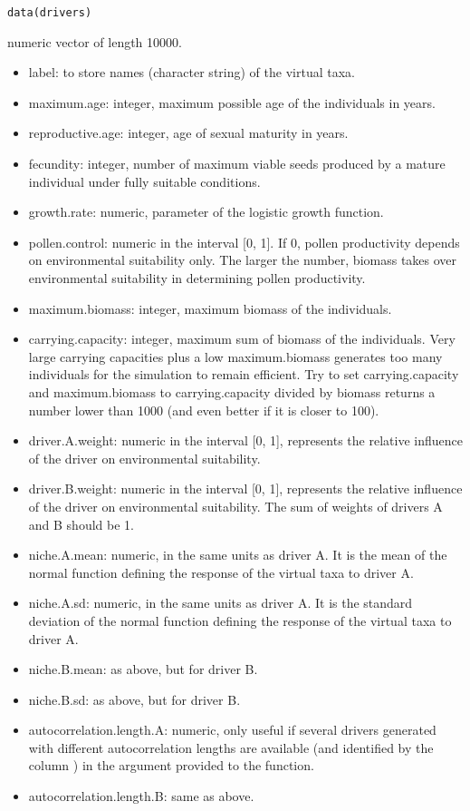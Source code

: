 \documentclass[letterpaper]{book}
\begin{document}
%
\begin{Usage}
\begin{verbatim}
data(drivers)
\end{verbatim}
\end{Usage}
%
\begin{Format}
numeric vector of length 10000.
\end{Format}
%
\begin{Details}\relax
\begin{itemize}

\item label: to store names (character string) of the virtual taxa.
\item maximum.age: integer, maximum possible age of the individuals in years.
\item reproductive.age: integer, age of sexual maturity in years.
\item fecundity: integer, number of maximum viable seeds produced by a mature individual under fully suitable conditions.
\item growth.rate: numeric, parameter of the logistic growth function.
\item pollen.control: numeric in the interval [0, 1]. If 0, pollen productivity depends on environmental suitability only. The larger the number, biomass takes over environmental suitability in determining pollen productivity.
\item maximum.biomass: integer, maximum biomass of the individuals.
\item carrying.capacity: integer, maximum sum of biomass of the individuals. Very large carrying capacities plus a low maximum.biomass generates too many individuals for the simulation to remain efficient. Try to set carrying.capacity and maximum.biomass to carrying.capacity divided by biomass returns a number lower than 1000 (and even better if it is closer to 100).
\item driver.A.weight: numeric in the interval [0, 1], represents the relative influence of the driver on environmental suitability.
\item driver.B.weight: numeric in the interval [0, 1], represents the relative influence of the driver on environmental suitability. The sum of weights of drivers A and B should be 1.
\item niche.A.mean: numeric, in the same units as driver A. It is the mean of the normal function defining the response of the virtual taxa to driver A.
\item niche.A.sd: numeric, in the same units as driver A. It is the standard deviation of the normal function defining the response of the virtual taxa to driver A.
\item niche.B.mean: as above, but for driver B.
\item niche.B.sd: as above, but for driver B.
\item autocorrelation.length.A: numeric, only useful if several drivers generated with different autocorrelation lengths are available (and identified by the column ) in the  argument provided to the  function.
\item autocorrelation.length.B: same as above.


\end{itemize}
\end{Details}
\end{document}

